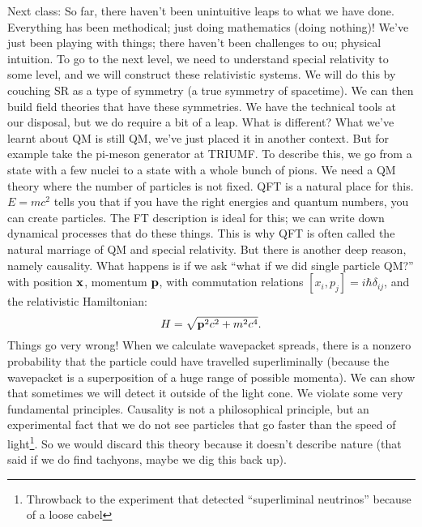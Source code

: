 Next class: So far, there haven't been unintuitive leaps to what we have done. Everything has been methodical; just doing mathematics (doing nothing)! We've just been playing with things; there haven't been challenges to ou; physical intuition. To go to the next level, we need to understand special relativity to some level, and we will construct these relativistic systems. We will do this by couching SR as a type of symmetry (a true symmetry of spacetime). We can then build field theories that have these symmetries. We have the technical tools at our disposal, but we do require a bit of a leap. What is different? What we've learnt about QM is still QM, we've just placed it in another context. But for example take the pi-meson generator at TRIUMF. To describe this, we go from a state with a few nuclei to a state with a whole bunch of pions. We need a QM theory where the number of particles is not fixed. QFT is a natural place for this. $E = mc^2$ tells you that if you have the right energies and quantum numbers, you can create particles. The FT description is ideal for this; we can write down dynamical processes that do these things. This is why QFT is often called the natural marriage of QM and special relativity. But there is another deep reason, namely causality. What happens is if we ask ``what if we did single particle QM?'' with position $\mathbf{x}$, momentum $\mathbf{p}$, with commutation relations $[x_i, p_j] = i\hbar\delta_{ij}$, and the relativistic Hamiltonian:
\begin{equation}
    H = \sqrt{\mathbf{p}^2c^2 + m^2c^4}.
\end{equation}
Things go very wrong! When we calculate wavepacket spreads, there is a nonzero probability that the particle could have travelled superliminally (because the wavepacket is a superposition of a huge range of possible momenta). We can show that sometimes we will detect it outside of the light cone. We violate some very fundamental principles. Causality is not a philosophical principle, but an experimental fact that we do not see particles that go faster than the speed of light\footnote{Throwback to the experiment that detected ``superliminal neutrinos'' because of a loose cabel}. So we would discard this theory because it doesn't describe nature (that said if we do find tachyons, maybe we dig this back up).